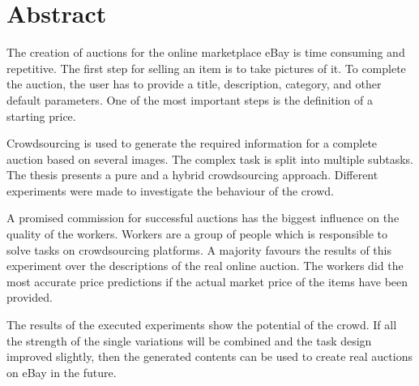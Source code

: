 \chapter*{Abstract}
\thispagestyle{empty}
The creation of auctions for the online marketplace eBay is time consuming and repetitive. The first step for selling an item is to take pictures of it. To complete the auction, the user has to provide a title, description, category, and other default parameters. One of the most important steps is the definition of a starting price.

Crowdsourcing is used to generate the required information for a complete auction based on several images. The complex task is split into multiple subtasks. The thesis presents a pure and a hybrid crowdsourcing approach. Different experiments were made to investigate the behaviour of the crowd.

A promised commission for successful auctions has the biggest influence on the quality of the workers. Workers are a group of people which is responsible to solve tasks on crowdsourcing platforms. A majority favours the results of this experiment over the descriptions of the real online auction. The workers did the most accurate price predictions if the actual market price of the items have been provided.
  
The results of the executed experiments show the potential of the crowd. If all the strength of the single variations will be combined and the task design improved slightly, then the generated contents can be used to create real auctions on eBay in the future.
\clearpage
